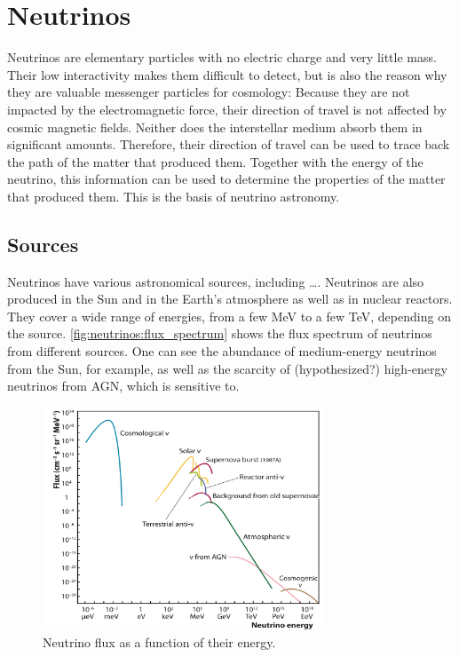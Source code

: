 \section{Neutrinos}

Neutrinos are elementary particles with no electric charge and very little mass.
Their low interactivity
  makes them difficult to detect,
  but is also the reason why they are valuable messenger particles for cosmology:
Because they are not impacted by the electromagnetic force,
  their direction of travel is not affected by cosmic magnetic fields.
Neither does the interstellar medium absorb them in significant amounts.
Therefore,
  their direction of travel can be used to trace back the path of the matter that produced them.
Together with the energy of the neutrino,
  this information can be used to determine the properties of the matter that produced them.
This is the basis of neutrino astronomy.


\subsection{Sources}
Neutrinos have various astronomical sources,
including
  …. %
Neutrinos are also produced in
  the Sun
  and in the Earth's atmosphere
  as well as in nuclear reactors.
They cover a wide range of energies, from a few MeV to a few TeV,
  depending on the source.
%
\autoref{fig:neutrinos:flux_spectrum} shows the flux spectrum of neutrinos from different sources.
One can see
  the abundance of medium-energy neutrinos from the Sun,
    for example,
  as well as the scarcity of (hypothesized?) high-energy neutrinos from AGN,
    which \icecube is sensitive to.

\begin{figure}
  \centering
  \includegraphics[width=0.75\textwidth]{content/plots/halftime/neutrinos-energy.png}
  \caption{Neutrino flux as a function of their energy. \citationneeded{}}
  \label{fig:neutrinos:flux_spectrum}
\end{figure}


